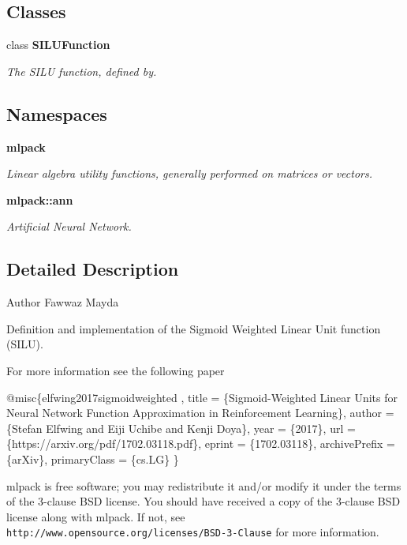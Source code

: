 \subsection*{Classes}
\begin{DoxyCompactItemize}
\item 
class \textbf{ S\+I\+L\+U\+Function}
\begin{DoxyCompactList}\small\item\em The S\+I\+LU function, defined by. \end{DoxyCompactList}\end{DoxyCompactItemize}
\subsection*{Namespaces}
\begin{DoxyCompactItemize}
\item 
 \textbf{ mlpack}
\begin{DoxyCompactList}\small\item\em Linear algebra utility functions, generally performed on matrices or vectors. \end{DoxyCompactList}\item 
 \textbf{ mlpack\+::ann}
\begin{DoxyCompactList}\small\item\em Artificial Neural Network. \end{DoxyCompactList}\end{DoxyCompactItemize}


\subsection{Detailed Description}
\begin{DoxyAuthor}{Author}
Fawwaz Mayda
\end{DoxyAuthor}
Definition and implementation of the Sigmoid Weighted Linear Unit function (S\+I\+LU).

For more information see the following paper


\begin{DoxyCode}
@misc\{elfwing2017sigmoidweighted ,
   title = \{Sigmoid-Weighted Linear Units \textcolor{keywordflow}{for} Neural Network Function
            Approximation in Reinforcement Learning\},
   author = \{Stefan Elfwing and Eiji Uchibe and Kenji Doya\},
   year = \{2017\},
   url = \{https:\textcolor{comment}{//arxiv.org/pdf/1702.03118.pdf\},}
   eprint = \{1702.03118\},
   archivePrefix = \{arXiv\},
   primaryClass = \{cs.LG\} \}
\end{DoxyCode}


mlpack is free software; you may redistribute it and/or modify it under the terms of the 3-\/clause B\+SD license. You should have received a copy of the 3-\/clause B\+SD license along with mlpack. If not, see {\tt http\+://www.\+opensource.\+org/licenses/\+B\+S\+D-\/3-\/\+Clause} for more information. 